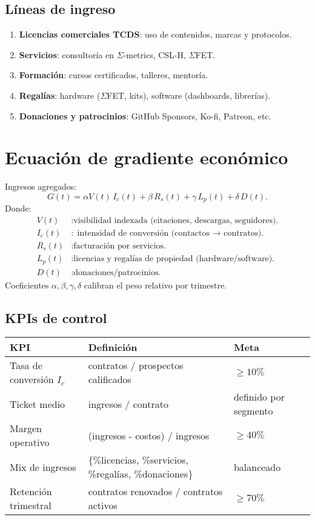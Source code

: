 \documentclass[12pt,letterpaper]{article}
\begin{document}
\subsection*{Líneas de ingreso}
\begin{enumerate}
  \item \textbf{Licencias comerciales TCDS}: uso de contenidos, marcas y protocolos.
  \item \textbf{Servicios}: consultoría en $\Sigma$-metrics, CSL-H, $\Sigma$FET.
  \item \textbf{Formación}: cursos certificados, talleres, mentoría.
  \item \textbf{Regalías}: hardware ($\Sigma$FET, kits), software (dashboards, librerías).
  \item \textbf{Donaciones y patrocinios}: GitHub Sponsors, Ko-fi, Patreon, etc.
\end{enumerate}

\section{Ecuación de gradiente económico}
Ingresos agregados:
\begin{equation}
G(t) = \alpha V(t)\, I_c(t) + \beta\, R_s(t) + \gamma\, L_p(t) + \delta\, D(t).
\end{equation}
\noindent Donde:
\begin{align*}
V(t) &\colon \text{visibilidad indexada (citaciones, descargas, seguidores).}\\
I_c(t) &\colon \text{intensidad de conversión (contactos $\rightarrow$ contratos).}\\
R_s(t) &\colon \text{facturación por servicios.}\\
L_p(t) &\colon \text{licencias y regalías de propiedad (hardware/software).}\\
D(t) &\colon \text{donaciones/patrocinios.}
\end{align*}
Coeficientes $\alpha,\beta,\gamma,\delta$ calibran el peso relativo por trimestre.

\subsection*{KPIs de control}
\begin{longtable}{@{}p{4cm}p{8cm}p{3cm}@{}}
\toprule
\textbf{KPI} & \textbf{Definición} & \textbf{Meta}\\
\midrule
Tasa de conversión $I_c$ & contratos / prospectos calificados & $\geq 10\%$\\
Ticket medio & ingresos / contrato & definido por segmento\\
Margen operativo & (ingresos - costos) / ingresos & $\geq 40\%$\\
Mix de ingresos & $\{ \%$licencias, \%servicios, \%regalías, \%donaciones$\}$ & balanceado\\
Retención trimestral & contratos renovados / contratos activos & $\geq 70\%$\\
\bottomrule
\end{longtable}
\end{document}
